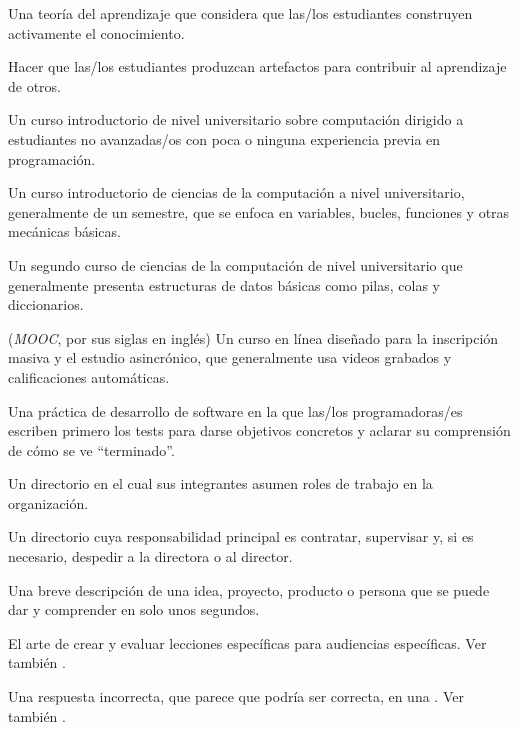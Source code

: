 \begin{description}
 Una teoría del aprendizaje que considera que
las/los estudiantes construyen activamente el conocimiento.

 Hacer que las/los estudiantes
produzcan artefactos para contribuir al aprendizaje de otros.

 Un curso introductorio de nivel universitario sobre computación
dirigido a estudiantes no avanzadas/os con poca o ninguna experiencia previa en programación.

 Un curso introductorio de ciencias de la computación a nivel universitario,
generalmente de un semestre, que se enfoca en variables, bucles, funciones y otras mecánicas básicas.

 Un segundo curso de ciencias de la computación de nivel universitario
que generalmente presenta estructuras de datos básicas como pilas, colas y diccionarios.

 (\emph{MOOC}, por sus siglas en inglés) Un curso en línea diseñado para la inscripción masiva y el estudio asincrónico, que generalmente usa videos grabados y calificaciones automáticas.

 Una práctica de desarrollo
de software en la que las/los programadoras/es escriben primero los tests
para darse objetivos concretos y aclarar su comprensión de cómo se ve ``terminado''.

 Un directorio en el cual sus integrantes asumen roles de trabajo en la organización.

 Un directorio cuya responsabilidad principal es
contratar, supervisar y, si es necesario, despedir a la directora o al director.

 Una breve descripción de una idea,
proyecto, producto o persona que se puede dar y comprender en solo unos segundos.

 El arte de crear y evaluar
lecciones específicas para audiencias específicas. Ver también
.

 Una respuesta incorrecta, que parece que podría ser correcta, 
en una . Ver también
.


\end{description}
